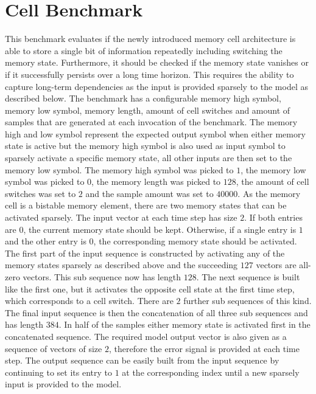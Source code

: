 \documentclass[draft,final]{vutinfth} %
\begin{document}
    \section{Cell Benchmark} \label{cell}
    This benchmark evaluates if the newly introduced memory cell architecture is able to store a single bit of information repeatedly including switching the memory state.
    Furthermore, it should be checked if the memory state vanishes or if it successfully persists over a long time horizon.
    This requires the ability to capture long-term dependencies as the input is provided sparsely to the model as described below.
    The benchmark has a configurable memory high symbol, memory low symbol, memory length, amount of cell switches and amount of samples that are generated at each invocation of the benchmark.
    The memory high and low symbol represent the expected output symbol when either memory state is active but the memory high symbol is also used as input symbol to sparsely activate a specific memory state, all other inputs are then set to the memory low symbol.
    The memory high symbol was picked to $1$, the memory low symbol was picked to $0$, the memory length was picked to $128$, the amount of cell switches was set to $2$ and the sample amount was set to $40000$.
    As the memory cell is a bistable memory element, there are two memory states that can be activated sparsely.
    The input vector at each time step has size $2$. If both entries are $0$, the current memory state should be kept.
    Otherwise, if a single entry is $1$ and the other entry is $0$, the corresponding memory state should be activated.
    The first part of the input sequence is constructed by activating any of the memory states sparsely as described above and the succeeding $127$ vectors are all-zero vectors.
    This sub sequence now has length $128$. The next sequence is built like the first one, but it activates the opposite cell state at the first time step, which corresponds to a cell switch.
    There are $2$ further sub sequences of this kind. The final input sequence is then the concatenation of all three sub sequences and has length $384$.
    In half of the samples either memory state is activated first in the concatenated sequence.
    The required model output vector is also given as a sequence of vectors of size $2$, therefore the error signal is provided at each time step.
    The output sequence can be easily built from the input sequence by continuing to set its entry to $1$ at the corresponding index until a new sparsely input is provided to the model.
\end{document}
